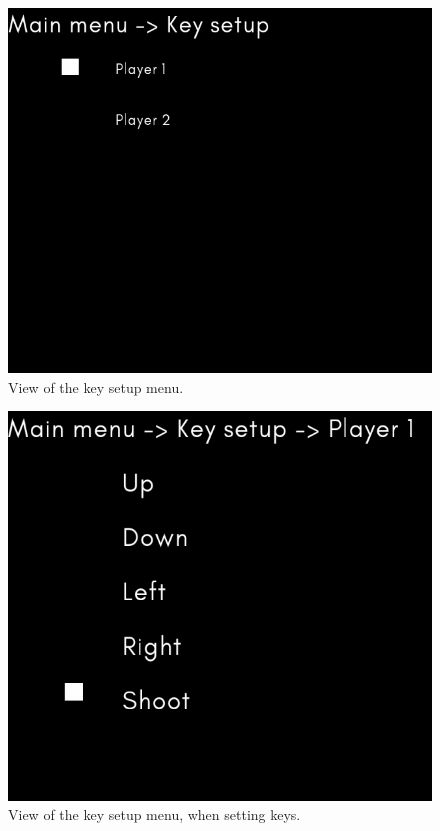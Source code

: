 \documentclass{article} %
\begin{document}
\begin{figure}[H]
\centering
\includegraphics[width=120mm]{images/key_setup}
\caption{View of the key setup menu.}
\label{keySetup}
\end{figure}  

\begin{figure}[H]
\centering
\includegraphics[width=120mm]{images/key_select}
\caption{View of the key setup menu, when setting keys.}
\label{keySelect}
\end{figure}  
\end{document}
